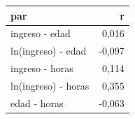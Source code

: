 \begin{tabular}{lr}
\toprule
par & r \\
\midrule
ingreso - edad & 0,016 \\
ln(ingreso) - edad & -0,097 \\
ingreso - horas & 0,114 \\
ln(ingreso) - horas & 0,355 \\
edad - horas & -0,063 \\
\bottomrule
\end{tabular}
